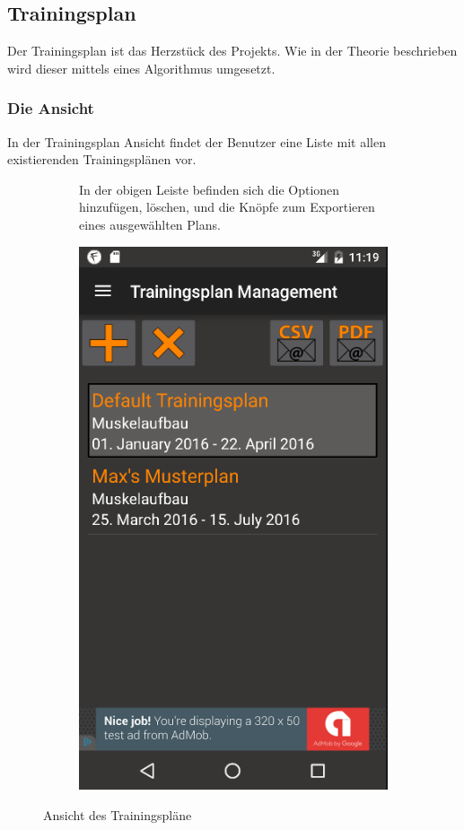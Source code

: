 \documentclass[FIPLY_base.tex]{subfiles}
\begin{document}
	\subsection{Trainingsplan}
		Der Trainingsplan ist das Herzstück des Projekts. Wie in der Theorie beschrieben wird dieser mittels eines Algorithmus umgesetzt. 
	\subsubsection{Die Ansicht}
		 In der Trainingsplan Ansicht findet der Benutzer eine Liste mit allen existierenden Trainingsplänen vor. 
		 \begin{figure}[H]
		 	\begin{subfigure}[b]{0.3\textwidth}
				In der obigen Leiste befinden sich die Optionen \grqq{}hinzufügen\grqq{}, \grqq{}löschen\grqq{}, und die Knöpfe zum Exportieren eines ausgewählten Plans.
				
		 	\end{subfigure}
		 	\begin{subfigure}[b]{0.3\textwidth}
		 		\includegraphics[scale=0.50]{img/tplanmgmt}
		 	\end{subfigure}
		 	\hfil
		 	\caption{Ansicht des Trainingspläne}
		 \end{figure}
\end{document}
